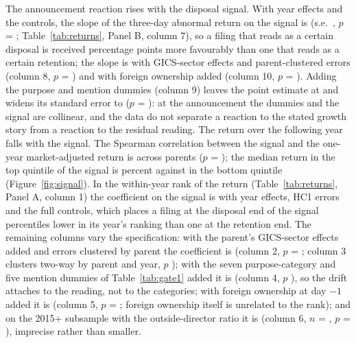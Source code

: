 The announcement reaction rises with the disposal signal. With year effects and the controls, the slope of the three-day abnormal return on the signal is \AnnSYearFE{} (s.e.\ \AnnSYearFESE{}, $p$ = \AnnSYearFEP{}; Table~\ref{tab:returns}, Panel B, column 7), so a filing that reads as a certain disposal is received \AnnSYearFEPP{} percentage points more favourably than one that reads as a certain retention; the slope is \AnnSSector{} with GICS-sector effects and parent-clustered errors (column 8, $p$ = \AnnSSectorP{}) and \AnnSForeign{} with foreign ownership added (column 10, $p$ = \AnnSForeignP{}). Adding the purpose and mention dummies (column 9) leaves the point estimate at \AnnSPlusPurposeMentions{} and widens its standard error to \AnnSPlusPurposeMentionsSE{} ($p$ = \AnnSPlusPurposeMentionsP{}): at the announcement the dummies and the signal are collinear, and the data do not separate a reaction to the stated growth story from a reaction to the residual reading. The return over the following year falls with the signal. The Spearman correlation between the signal and the one-year market-adjusted return is \SpearmanScoreBhar{} across \NScoreOneY{} parents ($p$ = \SpearmanScoreBharP{}); the median return in the top quintile of the signal is \QFiveMedian{} percent against \QOneMedian{} in the bottom quintile (Figure~\ref{fig:signal}). In the within-year rank of the return (Table~\ref{tab:returns}, Panel A, column 1) the coefficient on the signal is \RankSpecThreeCoef{} with year effects, HC1 errors and the full controls, which places a filing at the disposal end of the signal \RankSpecThreePctl{} percentiles lower in its year's ranking than one at the retention end. The remaining columns vary the specification: with the parent's GICS-sector effects added and errors clustered by parent the coefficient is \RankSSector{} (column 2, $p$ = \RankSSectorPFirm{}; column 3 clusters two-way by parent and year, $p$ \RankSSectorPTwoway{}); with the seven purpose-category and five mention dummies of Table~\ref{tab:gate1} added it is \RankSPlusPurposeMentions{} (column 4, $p$ \RankSPlusPurposeMentionsP{}), so the drift attaches to the reading, not to the categories; with foreign ownership at day $-1$ added it is \RankSForeign{} (column 5, $p$ = \RankSForeignP{}; foreign ownership itself is unrelated to the rank); and on the 2015+ subsample with the outside-director ratio it is \RankSBoard{} (column 6, $n$ = \RankSBoardN{}, $p$ = \RankSBoardP{}), imprecise rather than smaller.

